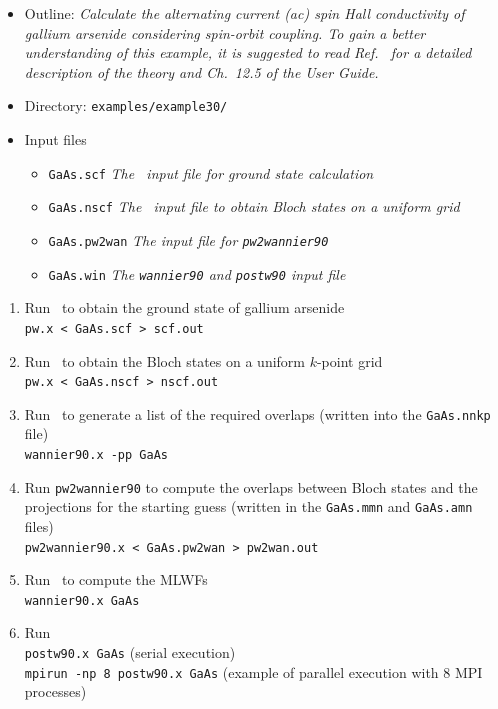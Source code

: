 \documentclass[a4paper,11pt,twoside]{article}
\begin{document}

\begin{itemize}
	\item{Outline: {\it Calculate the alternating current (ac) spin Hall conductivity
		of gallium arsenide considering spin-orbit coupling. 
		To gain a better understanding of this example, 
		it is suggested to read Ref.~\cite{qiao-prb2018} for a detailed 
		description of the theory and Ch.~12.5 of the User Guide.}}
	\item{Directory: {\tt examples/example30/}}
	\item{Input files}
	\begin{itemize}
		\item{ {\tt GaAs.scf} {\it The \pwscf\ input file for ground state
				calculation}}
		\item{ {\tt GaAs.nscf}  {\it The \pwscf\ input file to obtain Bloch
				states on a uniform grid}} 
		\item{ {\tt GaAs.pw2wan}  {\it The input file for {\tt pw2wannier90}}}
		\item{ {\tt GaAs.win}  {\it The {\tt wannier90} and {\tt postw90} input file}}
	\end{itemize}
\end{itemize}

\begin{enumerate}
	\item Run \pwscf\ to obtain the ground state of gallium arsenide\\
	{\tt pw.x < GaAs.scf > scf.out}
	
	\item Run \pwscf\ to obtain the Bloch states on a uniform $k$-point
	grid\\ 
	{\tt pw.x < GaAs.nscf > nscf.out}
	
	\item Run \wannier\ to generate a list of the required overlaps (written
	into the {\tt GaAs.nnkp} file)\\
	{\tt wannier90.x -pp GaAs}
	
	\item Run {\tt pw2wannier90} to compute the overlaps between Bloch
	states and the projections for the starting guess (written in the
	{\tt GaAs.mmn} and {\tt  GaAs.amn} files)\\
	{\tt pw2wannier90.x < GaAs.pw2wan > pw2wan.out}
	
	\item Run \wannier\ to compute the MLWFs\\
	{\tt wannier90.x GaAs}
	
	\item Run \postw\ \\
	{\tt postw90.x GaAs} (serial execution)\\
	{\tt mpirun -np 8 postw90.x GaAs} (example of parallel execution with
	8 MPI processes) 
	
\end{enumerate}
\end{document}
